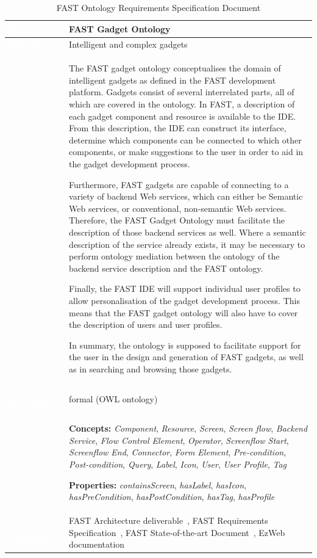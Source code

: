 \documentclass{article}
\begin{document}
\singlespacing
\begin{small}
\begin{longtable}[t]{|>{\columncolor{fast@lightgrey}}p{3.25cm}|p{11cm}|}
\caption{\label{tab:ontology_requirements_spec}FAST Ontology Requirements Specification Document}\\
\hline
\textcolor{white}{\textbf{Name}} & \textbf{FAST Gadget Ontology} \\ \hline
\textcolor{white}{\textbf{Domain}} & Intelligent and complex gadgets \\ \hline
\textcolor{white}{\textbf{Purpose}} & The FAST gadget ontology conceptualises the domain of intelligent gadgets as defined in the FAST development platform. Gadgets consist of several interrelated parts, all of which are covered in the ontology. In FAST, a description of each gadget component and resource is available to the IDE. From this description, the IDE can construct its interface, determine which components can be connected to which other components, or make suggestions to the user in order to aid in the gadget development process.

Furthermore, FAST gadgets are capable of connecting to a variety of backend Web services, which can either be Semantic Web services, or conventional, non-semantic Web services. Therefore, the FAST Gadget Ontology must facilitate the description of those backend services as well. Where a semantic description of the service already exists, it may be necessary to perform ontology mediation between the ontology of the backend service description and the FAST ontology.

Finally, the FAST IDE will support individual user profiles to allow personalisation of the gadget development process. This means that the FAST gadget ontology will also have to cover the description of users and user profiles.

In summary, the ontology is supposed to facilitate support for the user in the design and generation of FAST gadgets, as well as in searching and browsing those gadgets.\\ \hline 
\textcolor{white}{\textbf{Level of Formality}} & formal (OWL ontology) \\ \hline
\textcolor{white}{\textbf{Scope}} & \textbf{Concepts:} \emph{Component}, \emph{Resource}, \emph{Screen}, \emph{Screen flow}, \emph{Backend Service}, \emph{Flow Control Element}, \emph{Operator}, \emph{Screenflow Start}, \emph{Screenflow End}, \emph{Connector}, \emph{Form Element}, \emph{Pre-condition}, \emph{Post-condition}, \emph{Query}, \emph{Label}, \emph{Icon}, \emph{User}, \emph{User Profile}, \emph{Tag}

\textbf{Properties:} \emph{containsScreen}, \emph{hasLabel}, \emph{hasIcon}, \emph{hasPreCondition}, \emph{hasPostCondition}, \emph{hasTag}, \emph{hasProfile}\\ \hline
\textcolor{white}{\textbf{Sources of Knowledge}} & FAST Architecture deliverable~\cite{urena2010fast_architecture}, FAST Requirements Specification~\cite{villoslada2010fast_requirements}, FAST State-of-the-art Document~\cite{urmetzer2010fast_state_of_the_art}, EzWeb documentation~\cite{lizcano2008ezweb} \\ \hline
\end{longtable}
\end{small}
\end{document}
